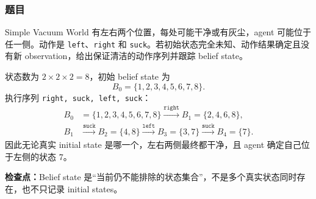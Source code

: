 \subsubsection*{题目}

Simple Vacuum World 有左右两个位置，每处可能干净或有灰尘，agent 可能位于任一侧。动作是 \texttt{left}、\texttt{right} 和 \texttt{suck}。若初始状态完全未知、动作结果确定且没有新 observation，给出保证清洁的动作序列并跟踪 belief state。

\begin{checkedsolution}
状态数为 $2\times2\times2=8$，初始 belief state 为
\[
  B_0=\{1,2,3,4,5,6,7,8\}.
\]
执行序列 \texttt{right, suck, left, suck}：
\[
  \begin{aligned}
    B_0&=\{1,2,3,4,5,6,7,8\}
      \xrightarrow{\texttt{right}} B_1=\{2,4,6,8\},\\
    B_1&\xrightarrow{\texttt{suck}} B_2=\{4,8\}
      \xrightarrow{\texttt{left}} B_3=\{3,7\}
      \xrightarrow{\texttt{suck}} B_4=\{7\}.
  \end{aligned}
\]
因此无论真实 initial state 是哪一个，左右两侧最终都干净，且 agent 确定自己位于左侧的状态 7。
\end{checkedsolution}

\textbf{检查点：}Belief state 是“当前仍不能排除的状态集合”，不是多个真实状态同时存在，也不只记录 initial states。
